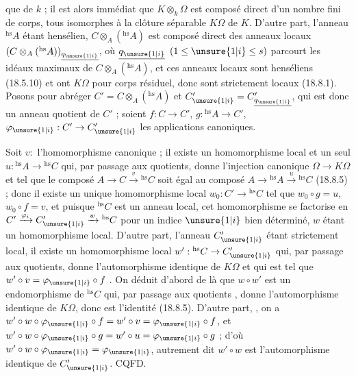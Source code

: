 
que de $k$ ; il est alors immédiat que $K\otimes_k\Omega$ est composé direct d'un nombre fini de corps, tous isomorphes à la clôture séparable $K\Omega$ de $K$. D'autre part, l'anneau ${}^{\mathrm{hs}}A$ étant hensélien, $C\otimes_A({}^{\mathrm{hs}}A)$ est composé direct des anneaux locaux $(C\otimes_A({}^{\mathrm{hs}}A))_{\underline{q_{\unsure{1|i}}}}$, où $\underline{q_{\unsure{1|i}}}$ $(1\leq\unsure{1|i}\leq s)$ parcourt les idéaux maximaux de  $C\otimes_A({}^{\mathrm{hs}}A)$, et ces anneaux locaux sont henséliens (18.5.10) et ont $K\Omega$ pour corps résiduel, donc sont strictement locaux (18.8.1). Posons pour abréger $C'=C\otimes_A({}^{\mathrm{hs}}A)$ et $C_{\unsure{1|i}}'=C'_{\underline{q_{\unsure{1|i}}}}$, qui est donc un anneau quotient de $C'$ ; soient $f:C\to C'$, $g:{}^{\mathrm{hs}}A\to C'$, $\varphi_{\unsure{1|i}}:C'\to C_{\unsure{1|i}}'$ les applications canoniques.


Soit $v:$   l'homomorphisme canonique ; il existe  un homomorphisme local et un seul $u:{}^{\mathrm{hs}}A\to{}^{\mathrm{hs}}C$ qui, par passage aux quotients, donne l'injection canonique $\Omega\to K\Omega$  et tel que le composé $A\to C\xrightarrow{v}{}^{\mathrm{hs}}C$ soit égal au composé $A\to{}^{\mathrm{hs}}A\xrightarrow{u}{}^{\mathrm{hs}}C$ (18.8.5) ; donc il existe un unique homomorphisme local $w_0:C'\to{}^{\mathrm{hs}}C$ tel que $w_0\circ g=u$, $w_0\circ f=v$, et puisque ${}^{\mathrm{hs}}C$ est un anneau local, cet homomorphisme se factorise en $C'\xrightarrow{\varphi_i}C_{\unsure{1|i}}'\xrightarrow{w}{}^{\mathrm{hs}}C$ pour un indice $\unsure{1|i}$ bien déterminé, $w$ étant un homomorphisme local. D'autre part, l'anneau $C_{\unsure{1|i}}'$ étant strictement local, il existe un homomorphisme local $w':{}^{\mathrm{hs}}C\to C_{\unsure{1|i}}'$ qui, par passage aux quotients, donne l'automorphisme identique de $K\Omega$ et qui est tel que $w'\circ v=\varphi_{\unsure{1|i}}\circ f$ \deleted{\unsure{,}} . On déduit d'abord de là que $w\circ w'$ est un endomorphisme de ${}^{\mathrm{hs}}C$ qui, par passage aux quotients , donne l'automorphisme identique de $K\Omega$, donc est l'identité (18.8.5). D'autre part, , on a $w'\circ w\circ\varphi_{\unsure{1|i}}\circ f=w'\circ v=\varphi_{\unsure{1|i}}\circ f$, et $w'\circ w\circ\varphi_{\unsure{1|i}}\circ g=w'\circ u=\varphi_{\unsure{1|i}}\circ g$ ; d'où $w'\circ w\circ\varphi_{\unsure{1|i}}=\varphi_{\unsure{1|i}}$, autrement dit $w'\circ w$ est l'automorphisme identique de $C_{\unsure{1|i}}'$. CQFD.


